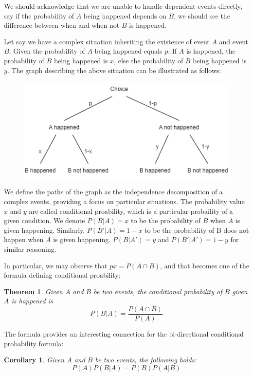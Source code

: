 \documentclass[12pt]{article}
\newtheorem*{theorem}{Theorem}
\newtheorem*{corollary}{Corollary}
\begin{document}
    We should acknowledge that we are unable to handle dependent events directly, say if the probability of $A$ being happened depends on $B$, we should see the difference between when and when not $B$ is happened. 

    Let say we have a complex situation inheriting the existence of event $A$ and event $B$. Given the probability of $A$ being happened equals $p$. If $A$ is happened, the probability of $B$ being happened is $x$, else the probability of $B$ being happened is $y$. The graph describing the above situation can be illustrated as follows:

    \begin{figure}[H]
        \centering
        \includegraphics[scale=0.8]{independence.png}
    \end{figure}

    We define the paths of the graph as the independence decomposition of a complex events, providing a focus on particular situations. The probability value $x$ and $y$ are called conditional proability, which is a particular probaility of a given condition. We denote $P(B|A)=x$ to be the probability of $B$ when $A$ is given happening. Similarly, $P(B'|A)=1-x$ to be the probability of B does not happen when $A$ is given happening. $P(B|A')=y$ and $P(B'|A')=1-y$ for similar reasoning.

    In particular, we may observe that $px=P(A\cap B)$, and that becomes one of the formula defining conditional proability:

    \begin{theorem}
        Given $A$ and $B$ be two events, the conditional probability of $B$ given $A$ is happened is \[P(B|A)=\frac{P(A\cap B)}{P(A)}\]
    \end{theorem}

    The formula provides an interesting connection for the bi-directional conditional probability formula:

    \begin{corollary}
        Given $A$ and $B$ be two events, the following holds: \[P(A)P(B|A)=P(B)P(A|B)\]
    \end{corollary}
\end{document}
